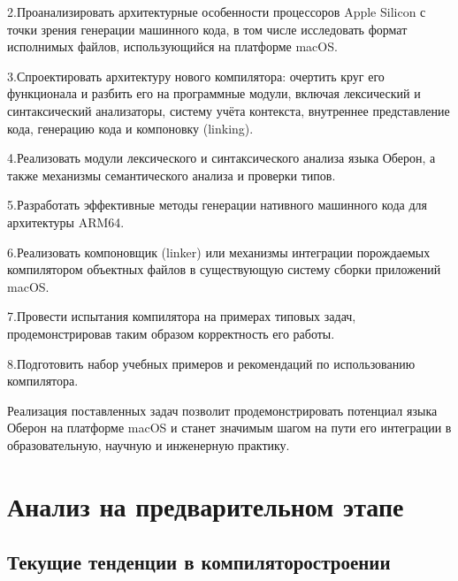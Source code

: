 \documentclass[utf8]{lgu}
\begin{document}
2.\hspace{0.5em}Проанализировать архитектурные особенности процессоров Apple Silicon с точки зрения генерации машинного кода, в том числе исследовать формат исполнимых файлов, использующийся на платформе macOS.

3.\hspace{0.5em}Спроектировать архитектуру нового компилятора: очертить круг его функционала и разбить его на программные модули, включая лексический и синтаксический анализаторы, систему учёта контекста, внутреннее представление кода, генерацию кода и компоновку (linking).

4.\hspace{0.5em}Реализовать модули лексического и синтаксического анализа языка Оберон, а также механизмы семантического анализа и проверки типов.

5.\hspace{0.5em}Разработать эффективные методы генерации нативного машинного кода для архитектуры ARM64.

6.\hspace{0.5em}Реализовать компоновщик (linker) или механизмы интеграции порождаемых компилятором объектных файлов в существующую систему сборки приложений macOS.

7.\hspace{0.5em}Провести испытания компилятора на примерах типовых задач, продемонстрировав таким образом корректность его работы.

8.\hspace{0.5em}Подготовить набор учебных примеров и рекомендаций по использованию компилятора.

Реализация поставленных задач позволит продемонстрировать потенциал языка Оберон на платформе macOS и станет значимым шагом на пути его интеграции в образовательную, научную и инженерную практику.

\section{Анализ на предварительном этапе}

\vspace{-6mm}

\firstparskip

\subsection{Текущие тенденции в компиляторостроении}
\end{document}
